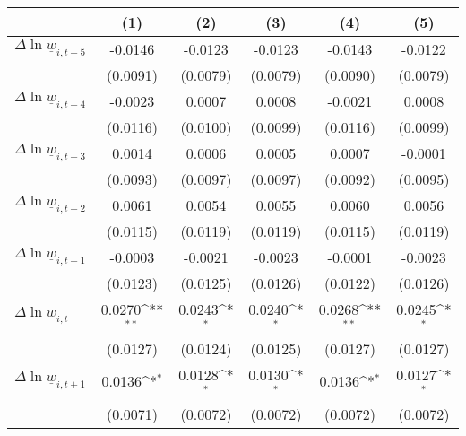 {
\def\sym#1{\ifmmode^{#1}\else\(^{#1}\)\fi}
\begin{tabular}{l*{5}{c}}
\hline\hline
          &\multicolumn{1}{c}{(1)}         &\multicolumn{1}{c}{(2)}         &\multicolumn{1}{c}{(3)}         &\multicolumn{1}{c}{(4)}         &\multicolumn{1}{c}{(5)}         \\
\hline
$\Delta \ln \underline{w}_{i,t-5}$&  -0.0146         &  -0.0123         &  -0.0123         &  -0.0143         &  -0.0122         \\
          & (0.0091)         & (0.0079)         & (0.0079)         & (0.0090)         & (0.0079)         \\
[1em]
$\Delta \ln \underline{w}_{i,t-4}$&  -0.0023         &   0.0007         &   0.0008         &  -0.0021         &   0.0008         \\
          & (0.0116)         & (0.0100)         & (0.0099)         & (0.0116)         & (0.0099)         \\
[1em]
$\Delta \ln \underline{w}_{i,t-3}$&   0.0014         &   0.0006         &   0.0005         &   0.0007         &  -0.0001         \\
          & (0.0093)         & (0.0097)         & (0.0097)         & (0.0092)         & (0.0095)         \\
[1em]
$\Delta \ln \underline{w}_{i,t-2}$&   0.0061         &   0.0054         &   0.0055         &   0.0060         &   0.0056         \\
          & (0.0115)         & (0.0119)         & (0.0119)         & (0.0115)         & (0.0119)         \\
[1em]
$\Delta \ln \underline{w}_{i,t-1}$&  -0.0003         &  -0.0021         &  -0.0023         &  -0.0001         &  -0.0023         \\
          & (0.0123)         & (0.0125)         & (0.0126)         & (0.0122)         & (0.0126)         \\
[1em]
$\Delta \ln \underline{w}_{i,t}$&   0.0270\sym{**} &   0.0243\sym{*}  &   0.0240\sym{*}  &   0.0268\sym{**} &   0.0245\sym{*}  \\
          & (0.0127)         & (0.0124)         & (0.0125)         & (0.0127)         & (0.0127)         \\
[1em]
$\Delta \ln \underline{w}_{i,t+1}$&   0.0136\sym{*}  &   0.0128\sym{*}  &   0.0130\sym{*}  &   0.0136\sym{*}  &   0.0127\sym{*}  \\
          & (0.0071)         & (0.0072)         & (0.0072)         & (0.0072)         & (0.0072)         \\

\end{tabular}}
